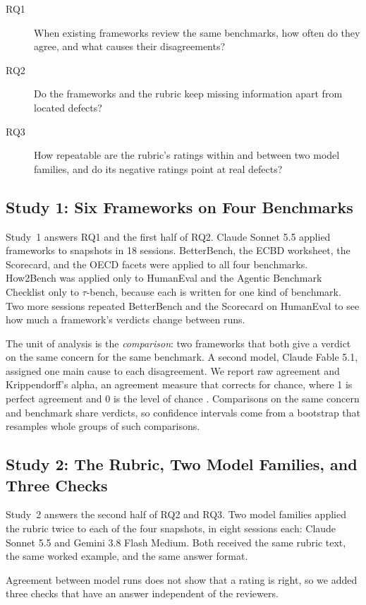 \documentclass[runningheads]{llncs}
\begin{document}
\begin{description}
\item[RQ1] When existing frameworks review the same benchmarks, how often do they agree, and what causes their disagreements?
\item[RQ2] Do the frameworks and the rubric keep missing information apart from located defects?
\item[RQ3] How repeatable are the rubric's ratings within and between two model families, and do its negative ratings point at real defects?
\end{description}


\subsection{Study 1: Six Frameworks on Four Benchmarks}
Study~1 answers RQ1 and the first half of RQ2. Claude Sonnet 5.5 applied frameworks to snapshots in 18 sessions. BetterBench, the ECBD worksheet, the Scorecard, and the OECD facets were applied to all four benchmarks. How2Bench was applied only to HumanEval and the Agentic Benchmark Checklist only to $\tau$-bench, because each is written for one kind of benchmark. Two more sessions repeated BetterBench and the Scorecard on HumanEval to see how much a framework's verdicts change between runs.

The unit of analysis is the \emph{comparison}: two frameworks that both give a verdict on the same concern for the same benchmark. A second model, Claude Fable 5.1, assigned one main cause to each disagreement. We report raw agreement and Krippendorff's alpha, an agreement measure that corrects for chance, where 1 is perfect agreement and 0 is the level of chance \cite{hayes_krippendorff_2007}. Comparisons on the same concern and benchmark share verdicts, so confidence intervals come from a bootstrap that resamples whole groups of such comparisons.

\subsection{Study 2: The Rubric, Two Model Families, and Three Checks}
\label{sec:study2_design}
Study~2 answers the second half of RQ2 and RQ3. Two model families applied the rubric twice to each of the four snapshots, in eight sessions each: Claude Sonnet 5.5 and Gemini 3.8 Flash Medium. Both received the same rubric text, the same worked example, and the same answer format.

Agreement between model runs does not show that a rating is right, so we added three checks that have an answer independent of the reviewers.
\end{document}
